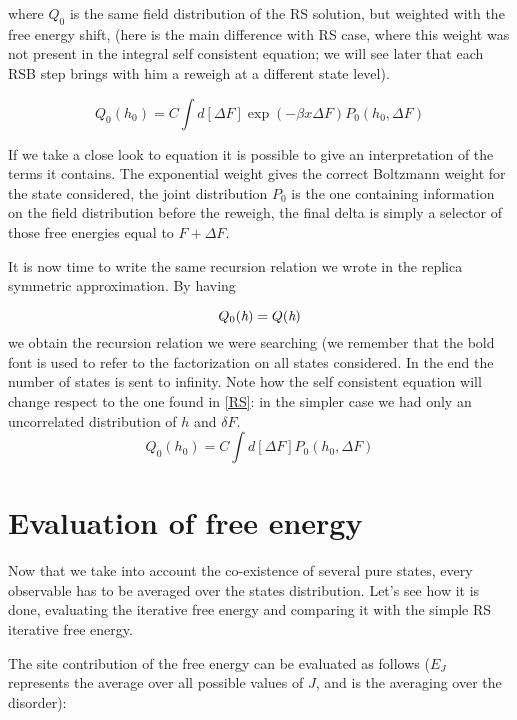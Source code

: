 where $Q_0$ is the same field distribution of the RS solution, but weighted with the free energy shift, (here is the main difference with RS case, where this weight was not present in the integral self consistent equation; we will see later that each RSB step brings with him a reweigh at a different state level).

\begin{equation}
Q_0(h_0) = C\int{d[\Delta F]\exp(-\beta x\Delta F)P_0(h_0,\Delta F)}
\label{eqdf}
\end{equation}

If we take a close look to equation \label{1RSB} it is possible to give an interpretation of the terms it contains. The exponential weight gives the correct Boltzmann weight for the state considered, the joint distribution $P_0$ is the one containing information on the field distribution before the reweigh, the final delta is simply a selector of those free energies equal to  $F + \Delta F$.

It is now time to write the same recursion relation we wrote in the replica symmetric approximation. By having

\begin{equation}
Q_0(\emph{h})=Q(\emph{h})
\label{1solution}
\end{equation}
we obtain the recursion relation we were searching (we remember that the bold font is used to refer to the factorization on all states considered. In the end the number of states is sent to infinity. Note how the self consistent equation will change respect to the one found in \ref{RS}: in the simpler case we had only an uncorrelated distribution of $h$ and $\delta F$.
\begin{equation}
Q_0(h_0) = C\int{d[\Delta F]P_0(h_0,\Delta F)}
\end{equation}


\section{Evaluation of free energy}

Now that we take into account the co-existence of several pure states, every observable has to be averaged over the states distribution. Let's see how it is done, evaluating the iterative free energy and comparing it with the simple RS iterative free energy.

The site contribution of the free energy can be evaluated as follows ($E_J$ represents the average over all possible values of $J$, and is the averaging over the disorder):

